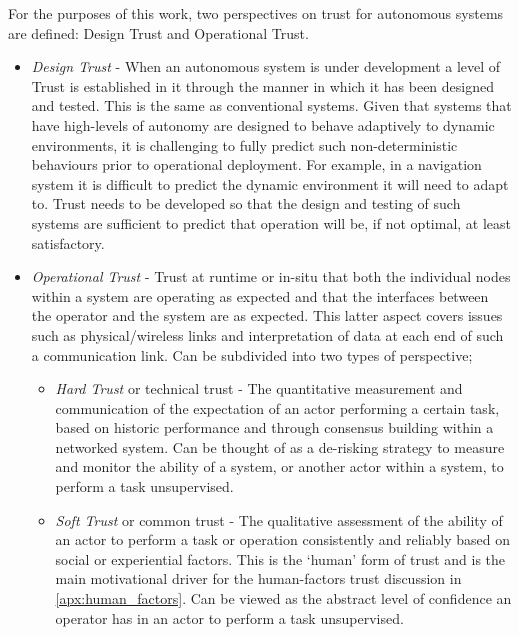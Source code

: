 For the purposes of this work, two perspectives on trust for autonomous systems are defined: Design Trust and Operational Trust.

\begin{itemize}
  \item \emph{Design Trust} - When an autonomous system is under development a level of Trust is established in it through the manner in which it has been designed and tested.
    This is the same as conventional systems.
    Given that systems that have high-levels of autonomy are designed to behave adaptively to dynamic environments, it is challenging to fully predict such non-deterministic behaviours prior to operational deployment.
    For example, in a navigation system it is difficult to predict the dynamic environment it will need to adapt to.
    Trust needs to be developed so that the design and testing of such systems are sufficient to predict that operation will be, if not optimal, at least satisfactory.

  \item \emph{Operational Trust} - Trust at runtime or in-situ that both the individual nodes within a system are operating as expected and that the interfaces between the operator and the system are as expected.
    This latter aspect covers issues such as physical/wireless links and interpretation of data at each end of such a communication link.
    Can be subdivided into two types of perspective;
    \begin{itemize}
      \item \emph{Hard Trust} or technical trust - The quantitative measurement and communication of the expectation of an actor performing a certain task, based on historic performance and through consensus building within a networked system.
    Can be thought of as a de-risking strategy to measure and monitor the ability of a system, or another actor within a system, to perform a task unsupervised.
  \item \emph{Soft Trust} or common trust - The qualitative assessment of the ability of an actor to perform a task or operation consistently and reliably based on social or experiential factors.
    This is the ‘human’ form of trust and is the main motivational driver for the human-factors trust discussion in \autoref{apx:human_factors}.
    Can be viewed as the abstract level of confidence an operator has in an actor to perform a task unsupervised.
    \end{itemize}
\end{itemize}

